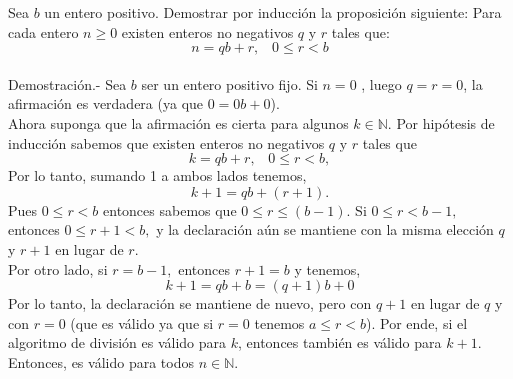 \begin{ej}
Sea $b$ un entero positivo. Demostrar por inducción la proposición siguiente: Para cada entero $n\geq 0$ existen enteros no negativos $q$ \; y \; $r$ tales que:
$$n=qb+r, \; \; \; 0\leq r < b$$ \\
Demostración.- \; Sea $b$ ser un entero positivo fijo. Si $n=0$ , luego $q=r=0$, la afirmación es verdadera (ya que $0=0b+0$).\\
Ahora suponga que la afirmación es cierta para algunos $k \in \mathbb{N}$. Por hipótesis de inducción sabemos que existen enteros no negativos $q$ \; y \; $r$ tales que $$k=qb+r, \; \; \; 0\leq r < b,$$ Por lo tanto, sumando 1 a ambos lados tenemos, $$k+1=qb+(r+1).$$ Pues $0\leq r < b$ entonces sabemos que $0\leq r \leq (b-1)$. Si $0\leq r < b-1,$ entonces $0\leq r+1<b,$ y la declaración aún se mantiene con la misma elección $q$ \; y \; $r+1$ en lugar de $r$.\\
Por otro lado, si $r=b-1,$ entonces $r+1=b$ y tenemos, $$k+1=qb+b=(q+1)b+0$$
Por lo tanto, la declaración se mantiene de nuevo, pero con $q+1$ en lugar de $q$ \; y con $r=0$ (que es válido ya que si $r=0$ tenemos $a\leq r < b$). Por ende, si el algoritmo de división es válido para $k$, entonces también es válido para $k+1.$ Entonces, es válido para todos $n \in \mathbb{N}$.\\\\
\end{ej}


